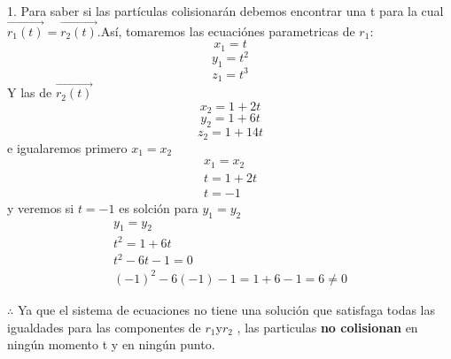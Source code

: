\documentclass[12pt]{article}
\begin{document}
1. Para saber si las partículas colisionarán debemos encontrar una t para la cual $\vec{r_1(t)} = \vec{r_2(t)}$.Así, tomaremos las ecuaciónes parametricas de $r_1$:
\[ x_1 = t\]
\[ y_1 = t^2\]
\[ z_1 = t^3\]
Y las de $\vec{r_2(t)}$
\[ x_2 = 1+2t\]
\[ y_2 = 1+6t\]
\[ z_2 = 1+14t\]
e igualaremos primero $x_1 = x_2$
 \begin{align*}
   x_1 = x_2 \\
   t = 1+2t \\
   t=-1
 \end{align*}
 y veremos si $t=-1$ es solción para $y_1 = y_2$
 \begin{align*}
   y_1 = y_2 \\
   t^2 =  1+6t \\
   t^2 -6t -1 = 0 \\
   (-1)^2 - 6 (-1) -1 = 1 +6 -1 = 6 \neq 0
 \end{align*}

$ \therefore $ Ya que el sistema de ecuaciones no tiene una solución que satisfaga todas las igualdades para las componentes de $r_1 $y$ r_2$ , las particulas \textbf{no colisionan} en ningún momento t y en ningún punto.\\
\end{document}
